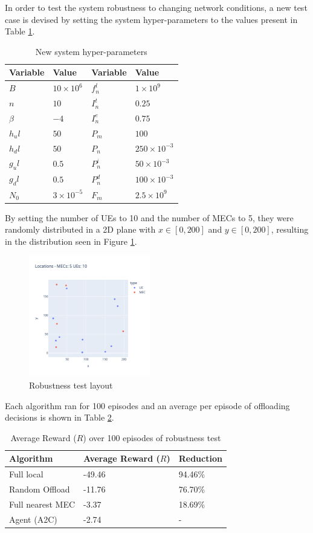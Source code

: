 In order to test the system robustness to changing network conditions, a new test case is devised by setting the system hyper-parameters to the values present in Table \ref{new_hyperparams}.

\begin{table}[H]
\centering
\begin{tabular}{|l|l|l|l|}
\hline
Variable             & Value & Variable                & Value \\ \hline
$B$&$10\times10^{6}$&$f_n^l$&$1\times10^{9}$\\
$n$&$10$&$I_n^t$&$0.25$\\
$\beta$&$-4$&$I_n^e$&$0.75$\\
$h_ul$&$50$& $P_m$&$100$\\
$h_dl$&$50$& $P_n$& $250\times10^{-3}$\\
$g_ul$&$0.5$&$P_n^i$&$50\times10^{-3}$\\
$g_dl$&$0.5$&$P_n^d$&$100\times10^{-3}$\\
$N_0$&$3\times10^{-5}$&$F_m$&$2.5\times10^{9}$\\ \hline
\end{tabular}
\caption{New system hyper-parameters}\label{new_hyperparams}
\end{table}

By setting the number of \acrshort{UE}s to 10 and the number of \acrshort{MEC}s to 5, they were randomly distributed in a 2D plane with $x \in [0, 200]$ and $y \in [0, 200]$, resulting in the distribution seen in Figure \ref{robust_test}.

\begin{figure}[H]
  \centering
  \includegraphics[width=200px]{images/5_10_layout.png}
  \caption{Robustness test layout}  \label{robust_test}
\end{figure}

Each algorithm ran for 100 episodes and an average per episode of offloading decisions is shown in Table \ref{robust_table}.

\begin{table}[H]
\centering
\begin{tabular}{|l|l|l|}
\hline
Algorithm        & Average Reward ($R$) & Reduction\\ \hline
Full local       & -49.46 & 94.46\%\\
Random Offload   & -11.76 & 76.70\%\\
Full nearest MEC & -3.37 & 18.69\%\\ 
Agent (A2C) & -2.74 & -\\ \hline
\end{tabular}
\caption{Average Reward ($R$) over 100 episodes of robustness test} \label{robust_table}
\end{table}

